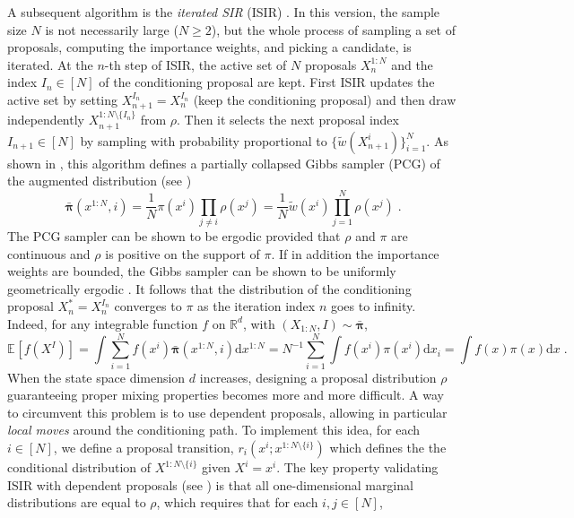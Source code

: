 \documentclass{article}
\def\rmd{\operatorname{d}\hspace{-2pt}}
\def\PE{\mathbb{E}}
\def\rset{\mathbb{R}}
\newcommand{\chunk}[3]{#1_{#2:#3}}
\def\rmd{\mathrm{d}}
\def\eqsp{\,}
\def\eqsp{\;}
\newcommand{\1}{\mathds{1}}
\def\target{\pi}
\def\proposal{\rho}
\def\weightfunc{\tilde{w}}
\newcommand{\chunku}[3]{#1^{#2:#3}}
\newcommand{\chunkum}[4]{#1^{#2:#3 \setminus \{#4\}}}
\def\measpi{\boldsymbol{\pi}}
\def\rset{\mathbb{R}}
\def\rmd{\mathrm{d}}
\begin{document}
A subsequent algorithm  is the \emph{iterated SIR} (ISIR) \cite{andrieu2010particle}. In this version, the sample size $N$ is not necessarily large ($N\geq 2$), but the whole process of sampling a set of proposals, computing the importance weights, and picking a  candidate, is iterated. At the $n$-th step of ISIR, the active set of $N$ proposals $\chunku{X_n}{1}{N}$ and the index $I_n \in [N]$ of the conditioning proposal are kept. First ISIR  updates the active set  by setting $X_{n+1}^{I_n}= X_n^{I_n}$ (keep the conditioning proposal) and then draw independently $\chunkum{X_{n+1}}{1}{N}{I_n}$ from $\proposal$.
Then it selects the next proposal index $I_{n+1} \in [N]$ by sampling with probability
proportional to $\{\weightfunc(X_{n+1}^i)\}_{i=1}^N$.
As shown in \cite{andrieu2010particle}, this algorithm  defines  a partially collapsed Gibbs sampler (PCG) of the augmented distribution (see )
$$
\bar{\measpi}(\chunku{x}{1}{N},i)=\frac{1}{N}  \target(x^i) \prod_{j \neq i} \proposal(x^j) =\frac{1}{N} \weightfunc(x^i) \prod_{j=1}^N \proposal(x^j) \eqsp.
$$
The PCG sampler can be shown to be ergodic provided that $\proposal$ and $\target$ are continuous and $\proposal$  is  positive on the support of $\target$. If in addition the importance weights are bounded, the Gibbs sampler can be shown to be uniformly geometrically ergodic  \cite{lindsten2015uniform,andrieu2018uniform}.
It follows that the distribution of the conditioning proposal $X_n^*= X_n^{I_n}$ converges to $\pi$ as the iteration index $n$ goes to infinity. Indeed, for any integrable function $f$ on $\rset^d$, with $(\chunk{X}{1}{N},I) \sim \bar{\measpi}$,
$$
\PE_{}[f(X^I)]= \int \sum_{i=1}^N f(x^i)  \bar{\measpi}(\chunku{x}{1}{N},i) \rmd \chunku{x}{1}{N} = N^{-1} \sum_{i=1}^N \int f(x^i) \target(x^i) \rmd x_i = \int f(x) \target(x) \rmd x \eqsp.
$$
When the state space dimension $d$ increases, designing a proposal distribution $\proposal$ guaranteeing proper mixing properties becomes more and more difficult. A way to circumvent this problem is to use dependent proposals, allowing in particular \emph{local moves} around the conditioning path. To implement this idea, for each $i \in [N]$, we define a proposal transition, $r_i(x^i; \chunkum{x}{1}{N}{i})$ which defines the the conditional distribution of $\chunkum{X}{1}{N}{i}$ given  $X^i= x^i$. The key property validating ISIR with dependent proposals (see ) is that all one-dimensional marginal distributions are equal to $\proposal$, which requires that for each $i,j  \in [N]$,
\end{document}
